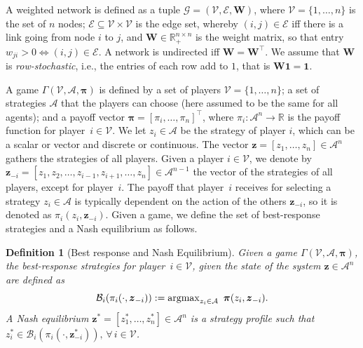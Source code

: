 \documentclass[letterpaper, 10 pt, conference]{ieeeconf}  %
\newcommand{\vect}[1]{\boldsymbol{#1}}
\newcommand{\mat}[1]{\boldsymbol{#1}}
\DeclareMathOperator*{\argmax}{\rm{argmax}} %
\newtheorem{definition}{Definition}
\begin{document}
A weighted network is defined as a tuple $\mathcal{G} = (\mathcal{V}, \mathcal{E}, \mat W)$, where $\mathcal{V}=\{1,\dots,n\}$ is the set of $n$ nodes; $\mathcal{E}\subseteq\mathcal{V}\times\mathcal{V}$ is the edge set, whereby $(i,j)\in\mathcal{E}$ iff there is a link going from node $i$ to $j$, and $\boldsymbol{W}\in\mathbb{R}_+^{n\times n}$ is the weight matrix, so that entry $w_{ji}>0\Longleftrightarrow (i,j) \in \mathcal{E}$. A network is undirected iff $\vect{W}=\vect{W}^\top$. We assume that $\mat W$ is \textit{row-stochastic}, i.e., the entries of each row add to $1$, that is $\vect{W1}=\vect 1$.

A game $\Gamma(\mathcal{V}, \mathcal{A}, \boldsymbol{\pi})$ is defined by a set of players $\mathcal{V}=\{1,\dots,n\}$; a set of strategies $\mathcal{A}$ that the players can choose (here assumed to be the same for all agents); and a payoff vector $\boldsymbol{\pi}=[\pi_i, \dots, \pi_n]^\top$, where $\pi_i:\mathcal{A}^n\rightarrow\mathbb{R}$ is the payoff function for player~$i\in \mathcal{V}$. We let $z_i \in \mathcal{A}$ be the strategy of player $i$, which can be a scalar or vector and discrete or continuous. The vector $\vect{z}=[z_1,\dots,z_n]\in\mathcal A^{n}$ gathers the strategies of all players. Given a player $i\in\mathcal V$, we denote by $\vect{z}_{-i}=[z_1,z_2,\dots,z_{i-1},z_{i+1},\dots,z_n]\in\mathcal A^{n-1}$ the vector of the strategies of all players, except for player~$i$. The payoff that player~$i$ receives for selecting a strategy $z_i\in\mathcal A$ is typically dependent on the action of the others $\vect{z}_{-i}$, so it is denoted as $\pi_i(z_i,\vect{z}_{-i})$. 
Given a game, we define the set of best-response strategies and a Nash equilibrium as follows.
\begin{definition}[Best response and Nash Equilibrium]\label{def:BR}
    Given a game $\Gamma(\mathcal{V}, \mathcal{A}, \boldsymbol{\pi})$, the best-response strategies for player~$i\in \mathcal{V}$, given the state of the system $\vect{z}\in\mathcal A^n$ are defined as 
    \begin{equation}\label{eq:best_response}
        \mathcal{B}_i(\pi_i(\cdot,\vect{z}_{-i})):= \argmax\nolimits_{{z_i}\in \mathcal{A}} \ \vect \pi (z_i,\vect{z}_{-i}).
    \end{equation}
    A Nash equilibrium $\vect{z}^*=[z_1^*,\dots,z_n^*]\in\mathcal A^{n}$ is a strategy profile such that $z_{i}^* \in \mathcal{B}_i( \pi_i(\cdot,\boldsymbol{z}^*_{-i})),\, \forall\,i\in\mathcal V$.
\end{definition}
\end{document}
